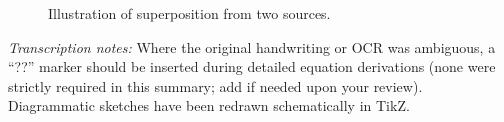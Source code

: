 \documentclass[11pt,a4paper]{article}
\begin{document}
\begin{figure}[h]
  \centering
  \caption{Illustration of superposition from two sources.}
\end{figure}

\bigskip
\noindent\textit{Transcription notes:} Where the original handwriting or OCR was ambiguous, a ``??'' marker should be inserted during detailed equation derivations (none were strictly required in this summary; add if needed upon your review). Diagrammatic sketches have been redrawn schematically in TikZ.

\end{document}
